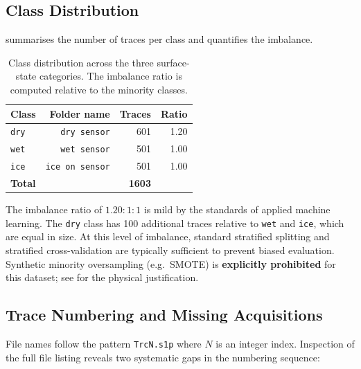 \subsection{Class Distribution}
\label{sec:dataset:classes}

 summarises the number of traces per class and
quantifies the imbalance.

\begin{table}[htbp]
    \centering
    \caption{%
        Class distribution across the three surface-state categories.
        The imbalance ratio is computed relative to the minority classes.%
    }
    \label{tab:class_dist}
    \begin{tabular}{lrrr}
        \toprule
        \textbf{Class} & \textbf{Folder name} & \textbf{Traces} &
            \textbf{Ratio} \\
        \midrule
        \texttt{dry} & \texttt{dry sensor} & 601 & 1.20 \\
        \texttt{wet} & \texttt{wet sensor} & 501 & 1.00 \\
        \texttt{ice} & \texttt{ice on sensor} & 501 & 1.00 \\
        \midrule
        \textbf{Total} & & \textbf{1603} & \\
        \bottomrule
    \end{tabular}
\end{table}

The imbalance ratio of $1.20\!:\!1\!:\!1$ is mild by the standards of
applied machine learning.  The \texttt{dry} class has \num{100}
additional traces relative to \texttt{wet} and \texttt{ice}, which are
equal in size.  At this level of imbalance, standard stratified splitting
and stratified cross-validation are typically sufficient to prevent
biased evaluation.  Synthetic minority oversampling (e.g.\ SMOTE) is
\textbf{explicitly prohibited} for this dataset; see
 for the physical justification.

\subsection{Trace Numbering and Missing Acquisitions}
\label{sec:dataset:gaps}

File names follow the pattern \texttt{Trc\textlangle{}N\textrangle{}.s1p}
where $N$ is an integer index.  Inspection of the full file listing
reveals two systematic gaps in the numbering sequence:

